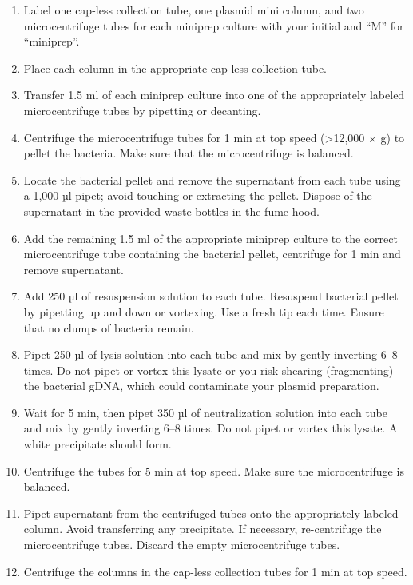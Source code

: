 \documentclass[]{book}
\providecommand{\tightlist}{%
  \setlength{\itemsep}{0pt}\setlength{\parskip}{0pt}}
\begin{document}
\begin{enumerate}
\def\labelenumi{\arabic{enumi}.}
\tightlist
\item
  Label one cap-less collection tube, one plasmid mini column, and two
  microcentrifuge tubes for each miniprep culture with your initial and
  ``M'' for ``miniprep''.
\item
  Place each column in the appropriate cap-less collection tube.
\item
  Transfer 1.5 ml of each miniprep culture into one of the appropriately
  labeled microcentrifuge tubes by pipetting or decanting.
\item
  Centrifuge the microcentrifuge tubes for 1 min at top speed
  (\textgreater{}12,000 × g) to pellet the bacteria. Make sure that the
  microcentrifuge is balanced.
\item
  Locate the bacterial pellet and remove the supernatant from each tube
  using a 1,000 µl pipet; avoid touching or extracting the pellet.
  Dispose of the supernatant in the provided waste bottles in the fume
  hood.
\item
  Add the remaining 1.5 ml of the appropriate miniprep culture to the
  correct microcentrifuge tube containing the bacterial pellet,
  centrifuge for 1 min and remove supernatant.
\item
  Add 250 µl of resuspension solution to each tube. Resuspend bacterial
  pellet by pipetting up and down or vortexing. Use a fresh tip each
  time. Ensure that no clumps of bacteria remain.
\item
  Pipet 250 µl of lysis solution into each tube and mix by gently
  inverting 6--8 times. Do not pipet or vortex this lysate or you risk
  shearing (fragmenting) the bacterial gDNA, which could contaminate
  your plasmid preparation.
\item
  Wait for 5 min, then pipet 350 µl of neutralization solution into each
  tube and mix by gently inverting 6--8 times. Do not pipet or vortex
  this lysate. A white precipitate should form.
\item
  Centrifuge the tubes for 5 min at top speed. Make sure the
  microcentrifuge is balanced.
\item
  Pipet supernatant from the centrifuged tubes onto the appropriately
  labeled column. Avoid transferring any precipitate. If necessary,
  re-centrifuge the microcentrifuge tubes. Discard the empty
  microcentrifuge tubes.
\item
  Centrifuge the columns in the cap-less collection tubes for 1 min at
  top speed.

\end{enumerate}
\end{document}
